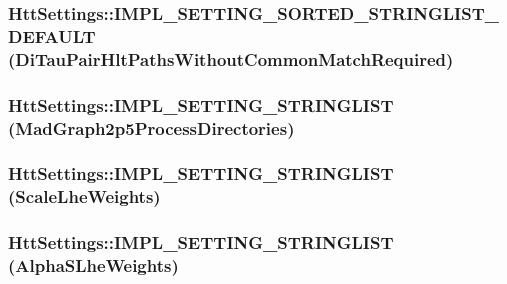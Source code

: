 \label{classHttSettings_ab2dc5540ed68cd907957fa57019a6a4e}
\hypertarget{classHttSettings_aad257d690e6fabf2ff987740523bd9bb}{
\subsubsection[{IMPL\_\-SETTING\_\-SORTED\_\-STRINGLIST\_\-DEFAULT}]{\setlength{\rightskip}{0pt plus 5cm}HttSettings::IMPL\_\-SETTING\_\-SORTED\_\-STRINGLIST\_\-DEFAULT (DiTauPairHltPathsWithoutCommonMatchRequired)}}
\label{classHttSettings_aad257d690e6fabf2ff987740523bd9bb}
\hypertarget{classHttSettings_adcce9324c375db2a5fe223eb85216ecd}{
\subsubsection[{IMPL\_\-SETTING\_\-STRINGLIST}]{\setlength{\rightskip}{0pt plus 5cm}HttSettings::IMPL\_\-SETTING\_\-STRINGLIST (MadGraph2p5ProcessDirectories)}}
\label{classHttSettings_adcce9324c375db2a5fe223eb85216ecd}
\hypertarget{classHttSettings_a224c669ebdf717c2310bd5d80ebedf40}{
\subsubsection[{IMPL\_\-SETTING\_\-STRINGLIST}]{\setlength{\rightskip}{0pt plus 5cm}HttSettings::IMPL\_\-SETTING\_\-STRINGLIST (ScaleLheWeights)}}
\label{classHttSettings_a224c669ebdf717c2310bd5d80ebedf40}
\hypertarget{classHttSettings_adfc879b87f116121f3f5a0c4644cd59a}{
\subsubsection[{IMPL\_\-SETTING\_\-STRINGLIST}]{\setlength{\rightskip}{0pt plus 5cm}HttSettings::IMPL\_\-SETTING\_\-STRINGLIST (AlphaSLheWeights)}}

